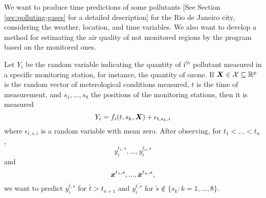 \BL We want to produce time predictions of some pollutants [See Section
\ref{sec:polluting-gases} for a detailed description] for the Rio de Janeiro
city, considering the weather, location, and time variables. We also want to
develop a method for estimating the air quality of not monitored regions by
the program based on the monitored ones.

Let $Y_i$ be the random
variable indicating the quantity of i$^{th}$ pollutant measured in a specific
monitoring station, for instance, the quantity of ozone. If $\boldsymbol{X} \in \mathcal{X}
\subseteq \mathbb{R}^{p}$ is the random vector of meterological conditions measured,
$t$ is the time of measurement, and $s_1, ..., s_8$ the positions of the
monitoring stations, then it is measured 
\begin{equation}
    \label{eq:problem definition}
    Y_i = f_i(t, s_k, \boldsymbol{X}) + \epsilon_{t,s_k,i}
\end{equation}
where $\epsilon_{t,s,i}$ is a random variable with mean zero. After
observing, for $t_1 < ... < t_n$,
$$y_i^{t_1,s}, ..., y_i^{t_n,s}$$ 
and 
$$
\boldsymbol{x}^{t_1,s}, ..., \boldsymbol{x}^{t_n,s},
$$
we want to predict $y_i^{\bar{t},s}$ for $\bar{t} > t_{n+1}$ and $y_i^{t,
\tilde{s}}$ for $\tilde{s} \not \in \{s_k : k = 1,...,8\}$.